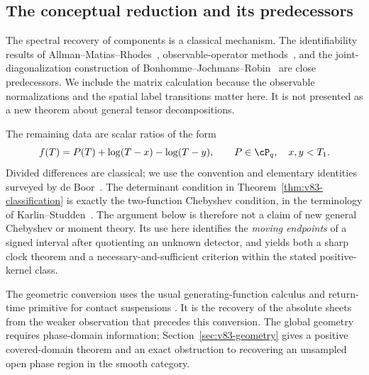 \subsection{The conceptual reduction and its predecessors}
The spectral recovery of components is a classical mechanism. The
identifiability results of Allman--Matias--Rhodes~\cite{V83AMR},
observable-operator methods~\cite{V83AHK}, and the joint-diagonalization
construction of Bonhomme--Jochmans--Robin~\cite{V83BJR} are close
predecessors. We include the matrix calculation because the observable
normalizations and the spatial label transitions matter here. It is not
presented as a new theorem about general tensor decompositions.

The remaining data are scalar ratios of the form
\begin{equation}\label{eq:v83-scalar}
 f(T)=P(T)+\log(T-x)-\log(T-y),\qquad P\in\cP_q,
                 \quad x,y<T_1.
\end{equation}
Divided differences are classical; we use the convention and elementary
identities surveyed by de Boor~\cite{V83deBoor}. The determinant condition
in Theorem~\ref{thm:v83-classification} is exactly the two-function
Chebyshev condition, in the terminology of Karlin--Studden~\cite{V83KS}.
The argument below is therefore not a claim of new general Chebyshev
or moment theory. Its use here identifies the \emph{moving endpoints}
of a signed interval after quotienting an unknown detector, and yields
both a sharp clock theorem and a necessary-and-sufficient criterion
within the stated positive-kernel class.

The geometric conversion uses the usual generating-function calculus
\cite{V83MW} and return-time primitive for contact suspensions
\cite{V83Geiges}. It is the recovery of the absolute sheets from the
weaker observation that precedes this conversion. The global geometry
requires phase-domain information; Section~\ref{sec:v83-geometry}
gives a positive covered-domain theorem and an exact obstruction to
recovering an unsampled open phase region in the smooth category.

